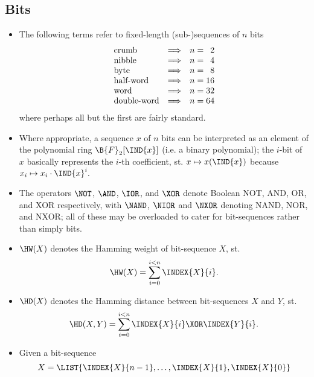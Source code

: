 
\subsection{Bits}

\begin{itemize}

\item The following terms refer to fixed-length (sub-)sequences of $n$ bits
      \[
      \begin{array}{lcc@{\;}c@{\;}r}
      \mbox      {crumb} &\Longrightarrow& n &=&  2 \\
      \mbox     {nibble} &\Longrightarrow& n &=&  4 \\
      \mbox       {byte} &\Longrightarrow& n &=&  8 \\
      \mbox  {half-word} &\Longrightarrow& n &=& 16 \\
      \mbox       {word} &\Longrightarrow& n &=& 32 \\
      \mbox{double-word} &\Longrightarrow& n &=& 64 \\
      \end{array}
      \]
      where perhaps all but the first are fairly standard.
\item Where appropriate, a sequence $x$ of $n$ bits can be interpreted as an
      element of the polynomial ring $\B{F}_2[\IND{x}]$
      (i.e. a binary polynomial);
      the $i$-bit of $x$ basically represents the $i$-th coefficient, st.
      $
      x \mapsto x( \IND{x} )
      $
      because
      $
      x_i \mapsto x_i \cdot \IND{x}^i .
      $
\item The operators $\NOT$, $\AND$, $\IOR$, and $\XOR$ denote Boolean NOT, AND,
      OR, and XOR respectively, with $\NAND$, $\NIOR$ and $\NXOR$ denoting NAND,
      NOR, and NXOR; all of these may be overloaded to cater for bit-sequences
      rather than simply bits.
\item $\HW( X )$
      denotes the Hamming weight   of      bit-sequence  $X$,         st.
      \[
      \HW( X )    = \sum_{i=0}^{i<n} \INDEX{X}{i}                   .
      \]
\item $\HD( X )$
      denotes the Hamming distance between bit-sequences $X$ and $Y$, st.
      \[
      \HD( X, Y ) = \sum_{i=0}^{i<n} \INDEX{X}{i} \XOR \INDEX{Y}{i} .
      \]
\item Given a bit-sequence
      \[
      X = \LIST{ \INDEX{X}{n-1}, \ldots, \INDEX{X}{1}, \INDEX{X}{0} } 
\]
\end{itemize}
